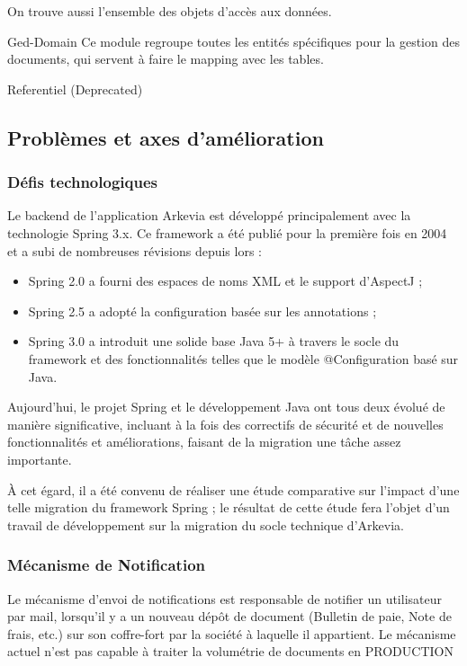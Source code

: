 On trouve aussi l'ensemble des objets d'accès aux données.

Ged-Domain
Ce module regroupe toutes les entités spécifiques pour la gestion des documents, qui servent à faire le mapping avec les tables.



Referentiel
(Deprecated)






\subsection{Problèmes et axes d'amélioration}
\subsubsection{Défis technologiques}
Le backend de l'application Arkevia est développé principalement avec la technologie Spring 3.x. Ce framework a été publié pour la première fois en 2004 et a subi de nombreuses révisions depuis lors : 
\begin{itemize}
    \item Spring 2.0 a fourni des espaces de noms XML et le support d'AspectJ ; 
    \item Spring 2.5 a adopté la configuration basée sur les annotations ; 
    \item Spring 3.0 a introduit une solide base Java 5+ à travers le socle du framework et des fonctionnalités telles que le modèle @Configuration basé sur Java.
\end{itemize}

Aujourd'hui, le projet Spring et le développement Java ont tous deux évolué de manière significative, incluant à la fois des correctifs de sécurité et de nouvelles fonctionnalités et améliorations, faisant de la migration une tâche assez importante.

À cet égard, il a été convenu de réaliser une étude comparative sur l'impact d'une telle migration du framework Spring ; le résultat de cette étude fera l'objet d'un travail de développement sur la migration du socle technique d'Arkevia.



\subsubsection{Mécanisme de Notification}
Le mécanisme d'envoi de notifications est responsable de notifier un utilisateur par mail, lorsqu'il y a un nouveau dépôt de document (Bulletin de paie, Note de frais, etc.) sur son coffre-fort par la société à laquelle il appartient.
Le mécanisme actuel n'est pas capable à traiter la volumétrie de documents en PRODUCTION

